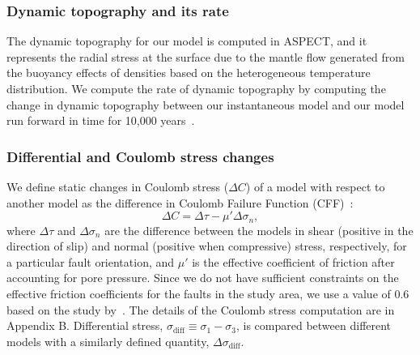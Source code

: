 \documentclass[draft,linenumbers]{agujournal2018}
\begin{document}
\subsubsection{Dynamic topography and its rate}
The dynamic topography for our model is computed in ASPECT, and it represents the radial stress at the surface due to the mantle flow generated from the buoyancy effects of densities based on the heterogeneous temperature distribution. We compute the rate of dynamic topography by computing the change in dynamic topography between our instantaneous model and our model run forward in time for 10,000 years~\citep{becker2015western}.  

\subsubsection{Differential and Coulomb stress changes}
We define static changes in Coulomb stress ($\Delta C$) of a model with respect to another model as the difference in Coulomb Failure Function (CFF)~\citep{king1994static}:
%
\begin{equation} \label{eq4}
    \Delta C = \Delta \tau - \mu' \Delta \sigma_n,
\end{equation}
%
where $\Delta \tau$ and $\Delta\sigma_n$ are the difference between the models in shear (positive in the direction of slip) and normal (positive when compressive) stress, respectively, for a particular fault orientation, and $\mu'$ is the effective coefficient of friction after accounting for pore pressure. Since we do not have sufficient constraints on the effective friction coefficients for the faults in the study area, we use a value of 0.6 based on the study by~\citet{hurd2012intraplate}. The details of the Coulomb stress computation are in Appendix B. Differential stress, $\sigma_{\text{diff}} \equiv \sigma_{1}-\sigma_{3}$, is compared between different models with a similarly defined quantity, $\Delta \sigma_{\text{diff}}$.
\end{document}
